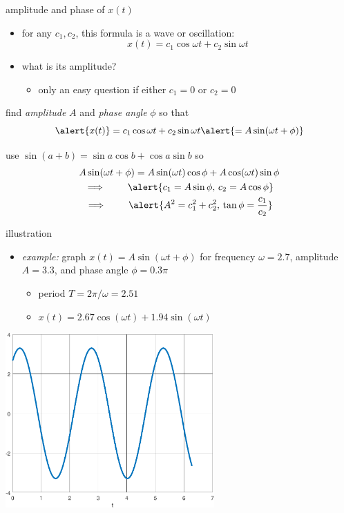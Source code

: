 \documentclass[dvipsnames,colorlinks]{beamer}
\begin{document}
\begin{frame}{amplitude and phase of $x(t)$}

\begin{itemize}
\item for any $c_1,c_2$, this formula is a wave or oscillation:
    $$x(t) = c_1 \cos \omega t + c_2 \sin \omega t$$
\item what is its amplitude?
    \begin{itemize}
    \item only an easy question if either $c_1 =0$ or $c_2=0$
    \end{itemize}
\end{itemize}

 find  \emph{amplitude} $A$ and \emph{phase angle} $\phi$ so that
    $$\alert{x(t)} = c_1 \cos \omega t + c_2 \sin \omega t \alert{= A \sin(\omega t + \phi)}$$

 use $\sin(a+b) = \sin a \cos b + \cos a \sin b$ so
\begin{gather*}
A \sin(\omega t + \phi) = A \sin(\omega t) \cos\phi + A \cos(\omega t) \sin\phi \\
\implies \qquad \alert{c_1 = A \sin\phi, \, c_2 = A \cos \phi} \\
\implies \qquad \alert{A^2 = c_1^2 + c_2^2, \, \tan \phi = \frac{c_1}{c_2}}
\end{gather*}
\end{frame}


\begin{frame}{illustration}

\begin{itemize}
\item \emph{example:} graph $x(t) = A \sin(\omega t + \phi)$ for frequency $\omega=2.7$, amplitude $A=3.3$, and phase angle $\phi=0.3 \pi$
    \begin{itemize}
    \item period $T=2\pi/\omega = 2.51$
    \item $x(t) = 2.67 \cos(\omega t) + 1.94 \sin(\omega t)$
    \end{itemize}
\end{itemize}

\hfill \includegraphics[width=0.6\textwidth]{figs/altwave}
\end{frame}
\end{document}
